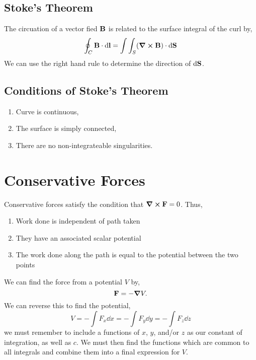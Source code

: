 \documentclass{book}
\begin{document}
\subsection{Stoke's Theorem}
The circuation of a vector fied $\vb{B}$ is related to the surface integral of the curl by,
\begin{equation}
	\oint_C \vb{B}\cdot\dd{\vb{l}} = \int\int_S (\curl{\vb{B}})\cdot\dd{\vb{S}}
\end{equation}
We can use the right hand rule to determine the direction of $\dd{\vb{S}}$.
\subsection{Conditions of Stoke's Theorem}
\begin{enumerate}
	\item Curve is continuous,
	\item The surface is simply connected,
	\item There are no non-integrateable singularities.
\end{enumerate}
\section{Conservative Forces}
Conservative forces satisfy the condition that $\curl{\vb{F}} = 0$. Thus,
\begin{enumerate}
	\item Work done is independent of path taken
	\item They have an associated scalar potential
	\item The work done along the path is equal to the potential between the two points
\end{enumerate}
We can find the force from a potential $V$ by,
\begin{equation}
	\vb{F} = -\grad{V}.
\end{equation}
We can reverse this to find the potential,
\begin{equation}
	V = - \int F_x \dd{x} = - \int F_y\dd{y} = - \int{F_z}\dd{z}
\end{equation}
we must remember to include a functions of $x$, $y$, and/or $z$ as our constant of integration, as well as $c$. We must then find the functions which are common to all integrals and combine them into a final expression for $V$.
\end{document}
